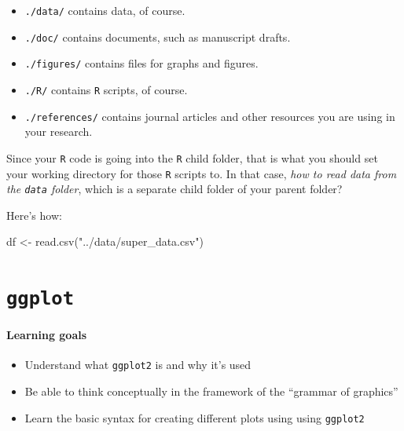 \documentclass[
]{book}
\newenvironment{Shaded}{\begin{snugshade}}{\end{snugshade}}
\newcommand{\FunctionTok}[1]{\textcolor[rgb]{0.00,0.00,0.00}{#1}}
\newcommand{\NormalTok}[1]{#1}
\newcommand{\OtherTok}[1]{\textcolor[rgb]{0.56,0.35,0.01}{#1}}
\newcommand{\StringTok}[1]{\textcolor[rgb]{0.31,0.60,0.02}{#1}}
\providecommand{\tightlist}{%
  \setlength{\itemsep}{0pt}\setlength{\parskip}{0pt}}
\begin{document}
\begin{itemize}
\tightlist
\item
  \texttt{./data/} contains data, of course.
\item
  \texttt{./doc/} contains documents, such as manuscript drafts.
\item
  \texttt{./figures/} contains files for graphs and figures.
\item
  \texttt{./R/} contains \texttt{R} scripts, of course.
\item
  \texttt{./references/} contains journal articles and other resources you are using in your research.
\end{itemize}

Since your \texttt{R} code is going into the \texttt{R} child folder, that is what you should set your working directory for those \texttt{R} scripts to. In that case, \emph{how to read data from the \texttt{data} folder}, which is a separate child folder of your parent folder?

Here's how:

\begin{Shaded}
\begin{Highlighting}[]
\NormalTok{df }\OtherTok{\textless{}{-}} \FunctionTok{read.csv}\NormalTok{(}\StringTok{"../data/super\_data.csv"}\NormalTok{)}
\end{Highlighting}
\end{Shaded}

\hypertarget{ggplot}{%
\chapter{\texorpdfstring{\texttt{ggplot}}{ggplot}}\label{ggplot}}

\hypertarget{learning-goals-8}{%
\subsubsection*{Learning goals}\label{learning-goals-8}}

\begin{itemize}
\tightlist
\item
  Understand what \texttt{ggplot2} is and why it's used
\item
  Be able to think conceptually in the framework of the ``grammar of graphics''
\item
  Learn the basic syntax for creating different plots using using \texttt{ggplot2}
\end{itemize}
\end{document}
